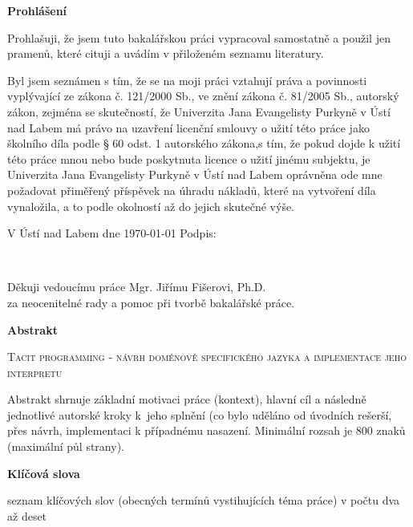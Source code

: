 \documentclass[male,czech]{kithesis}
\newcommand{\TITULcz}{Tacit programming - návrh doménově specifického jazyka a implementace jeho interpretu} %
\begin{document}
\cleardoublepage
\thispagestyle{empty}

\textbf{Prohlášení}

Prohlašuji, že jsem tuto bakalářskou práci vypracoval samostatně a použil
jen pramenů, které cituji a uvádím v přiloženém seznamu literatury.

\vspace{1em}
Byl jsem seznámen s tím, že se na moji práci vztahují práva a povinnosti vyplývající ze zákona č. 121/2000 Sb., ve znění zákona č. 81/2005 Sb., autorský zákon, zejména se skutečností, že Univerzita Jana Evangelisty Purkyně v Ústí nad Labem má právo na uzavření licenční smlouvy o užití této práce jako školního díla podle § 60 odst. 1 autorského zákona,s tím, že pokud dojde k užití této práce mnou nebo bude poskytnuta licence o užití jinému
subjektu, je Univerzita Jana Evangelisty Purkyně v Ústí nad Labem oprávněna ode mne požadovat přiměřený příspěvek na úhradu nákladů, které na vytvoření díla vynaložila, a to podle okolností až do jejich skutečné výše.

\vspace{1em}
V Ústí nad Labem dne \today \hspace{0.3\textwidth} Podpis:


\clearpage
\thispagestyle{empty}
~\vfill

\begin{flushright}
  Děkuji vedoucímu práce Mgr. Jiřímu Fišerovi, Ph.D.\\ za neocenitelné rady a pomoc při tvorbě bakalářské práce.
\end{flushright}

\cleardoublepage
\thispagestyle{empty}

\textbf{\textsf{Abstrakt}}

\textsc{\TITULcz}

Abstrakt shrnuje základní motivaci práce (kontext), hlavní cíl a následně jednotlivé
autorské kroky k~jeho splnění (co bylo uděláno od úvodních rešerší, přes návrh, implementaci k případnému nasazení. Minimální rozsah je 800 znaků (maximální půl strany).

\textbf{\textsf{Klíčová slova}}

seznam klíčových slov (obecných termínů vystihujících téma práce) v počtu dva až deset 

\vspace{1em}
\hrulefill
\vspace{1em}
\end{document}
